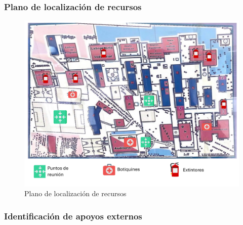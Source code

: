     \subsubsection{Plano de localización de recursos}
    
    \begin{figure}[H]
        \centering
        \includegraphics[scale=0.25]{13/img/localizacionDeRecursos.pdf}
        \caption{Plano de localización de recursos}
    \end{figure}
    \subsubsection{ Identificación de apoyos externos}
    
